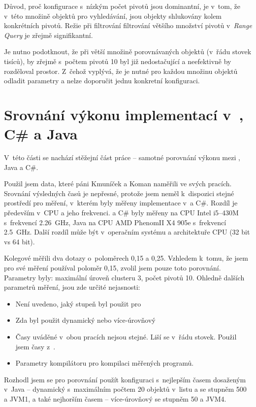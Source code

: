 Důvod, proč konfigurace s~nízkým počet pivotů jsou dominantní, je v~tom, že v~této množině objektů pro vyhledávání, jsou objekty shlukovány kolem konkrétních pivotů.
Režie při filtrování filtrování většího množství pivotů v~\emph{Range Query} je zřejmě signifikantní.

Je nutno podotknout, že při větší množině porovnávaných objektů (v~řádu stovek tisíců), by zřejmě \MIndex{} s~počtem pivotů 10 byl již nedostačující a neefektivně by rozděloval prostor.
Z~čehož vyplývá, že je nutné pro každou množinu objektů odladit parametry  a nelze doporučit jednu konkretní konfiguraci.

\section{Srovnání výkonu implementací v~{\protect \CC}, C\# a Java}
V~této části se nachází stěžejní část práce -- samotné porovnání výkonu \MIndex{} mezi \CC, Java a C\#.

Použil jsem data, které páni Kmuníček a Koman naměřili ve svých pracích\cite{Kmunicek2011thesis}\cite{Koman2012thesis}.
Srovnání výsledných časů je nepřesné, protože jsem neměl k~dispozici stejné prostředí pro měření, v~kterém byly měřeny implementace v~\CC a C\#.
Rozdíl je především v~CPU a jeho frekvenci.
\CC a C\# byly měřeny na CPU Intel i5--430M s~frekvencí \SI{2,26}{\GHz}, Java na CPU AMD Phenom\texttrademark II X4 905e s~frekvencí \SI{2,5}{\GHz}.
Další rozdíl může být v~operačním systému a architektuře CPU (32 bit vs 64 bit).

Kolegové měřili dva dotazy o~poloměrech 0,15 a 0,25.
Vzhledem k~tomu, že jsem pro své měření používal poloměr 0,15, zvolil jsem pouze toto porovnání.
Parametry  byly: maximální úroveň clusteru 3, počet pivotů 10.
Ohledně dalších parametrů měření, jsou zde určité nejasnosti:
\begin{itemize}
\item Není uvedeno, jaký stupeň byl použit pro \BPTree{}
\item Zda byl použit dynamický nebo více-úrovňový \MIndex{}
\item Časy uváděné v~obou pracích nejsou stejné. Liší se v~řádu stovek. Použil jsem časy z~\cite{Kmunicek2011thesis}.
\item Parametry kompilátoru pro kompilaci měřených programů.
\end{itemize}

Rozhodl jsem se pro porovnání použít konfiguraci s~nejlepším časem dosaženým v~Java -- dynamický \MIndex{} s~maximálním počtem 20 objektů v~listu a se stupněm \BPTree{} 500 a JVM1, a také nejhorším časem -- více-úrovňový \MIndex{} se stupněm \BPTree{} 50 a JVM4.

